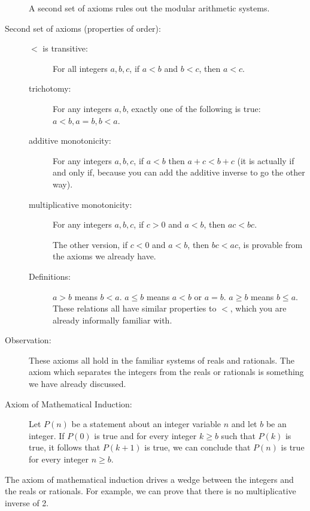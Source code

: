 \documentclass[12pt]{article}
\begin{document}
\begin{description}
A second set of axioms rules out the modular arithmetic systems.

\item[Second set of axioms (properties of order):]

\begin{description}

\item[$<$ is transitive:]  For all integers $a,b,c$, if $a<b$ and $b<c$, then $a<c$.

\item[trichotomy:]  For any integers $a,b$, exactly one of the following is true:  $a<b, a=b, b<a$.

\item[additive monotonicity:]  For any integers $a,b,c$, if $a<b$ then $a+c<b+c$ (it is actually if and only if, because you can add the additive inverse to go the other way).

\item[multiplicative monotonicity:]  For any integers $a,b,c$, if $c>0$ and $a<b$, then $ac<bc$.

The other version, if $c<0$ and $a<b$, then $bc<ac$, is provable from the axioms we already have.

\item[Definitions:]  $a>b$ means $b<a$.  $a \leq b$ means $a<b$ or $a=b$.  $a \geq b$ means $b \leq a$.
These relations all have similar properties to $<$, which you are already informally familiar with.

\end{description}

\item[Observation:]  These axioms all hold in the familiar systems of reals and rationals.  The axiom which separates
the integers from the reals or rationals is something we have already discussed.

\item[Axiom of Mathematical Induction:]  Let $P(n)$ be a statement about an integer variable $n$ and let
$b$ be an integer.  If $P(0)$ is true and for every integer $k \geq b$ such that $P(k)$ is true, it follows that $P(k+1)$ is true,
we can conclude that $P(n)$ is true for every integer $n \geq b$.

\end{description}

The axiom of mathematical induction drives a wedge between the integers and the reals or rationals.  For example, we can prove that there is no multiplicative inverse of 2.
\end{document}
